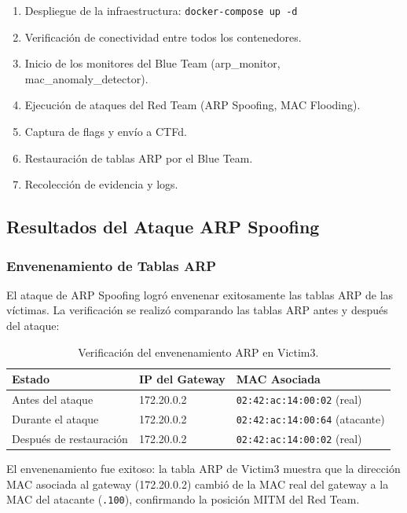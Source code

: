 \documentclass[12pt, a4paper]{article}
\begin{document}
\begin{enumerate}[leftmargin=2cm]
    \item Despliegue de la infraestructura: \texttt{docker-compose up -d}
    \item Verificaci\'on de conectividad entre todos los contenedores.
    \item Inicio de los monitores del Blue Team (arp\_monitor, mac\_anomaly\_detector).
    \item Ejecuci\'on de ataques del Red Team (ARP Spoofing, MAC Flooding).
    \item Captura de flags y env\'io a CTFd.
    \item Restauraci\'on de tablas ARP por el Blue Team.
    \item Recolecci\'on de evidencia y logs.
\end{enumerate}

\subsection{Resultados del Ataque ARP Spoofing}

\subsubsection{Envenenamiento de Tablas ARP}

El ataque de ARP Spoofing logr\'o envenenar exitosamente las tablas ARP de las v\'ictimas. La verificaci\'on se realiz\'o comparando las tablas ARP antes y despu\'es del ataque:

\begin{table}[H]
    \centering
    \caption{Verificaci\'on del envenenamiento ARP en Victim3.}
    \label{tab:arp-poison}
    \begin{tabular}{|l|l|l|}
        \hline
        \textbf{Estado} & \textbf{IP del Gateway} & \textbf{MAC Asociada} \\
        \hline\hline
        Antes del ataque & 172.20.0.2 & \texttt{02:42:ac:14:00:02} (real) \\
        \hline
        Durante el ataque & 172.20.0.2 & \texttt{02:42:ac:14:00:64} (atacante) \\
        \hline
        Despu\'es de restauraci\'on & 172.20.0.2 & \texttt{02:42:ac:14:00:02} (real) \\
        \hline
    \end{tabular}
\end{table}

\begin{resultbox}
El envenenamiento fue exitoso: la tabla ARP de Victim3 muestra que la direcci\'on MAC asociada al gateway (172.20.0.2) cambi\'o de la MAC real del gateway a la MAC del atacante (\texttt{.100}), confirmando la posici\'on MITM del Red Team.
\end{resultbox}
\end{document}
